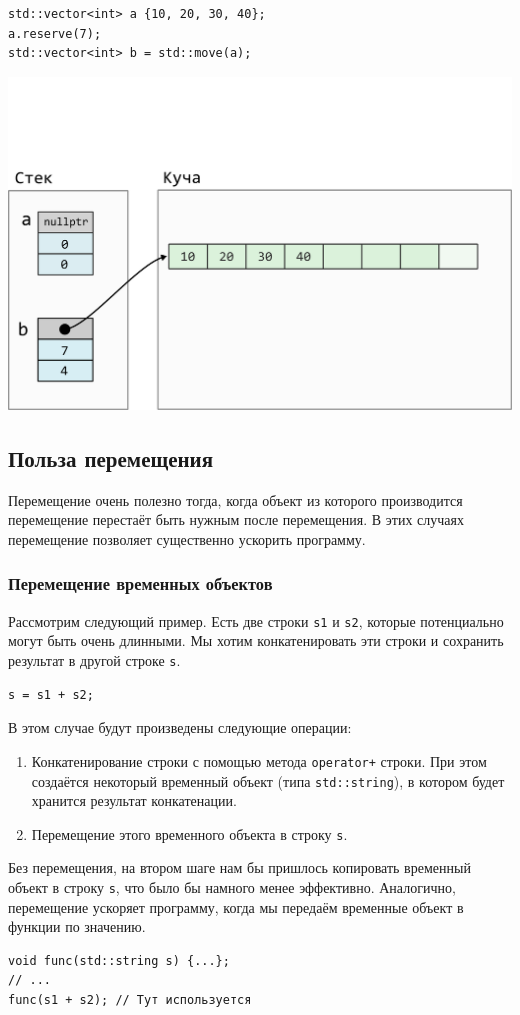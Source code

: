 \documentclass{article}
\begin{document}
\begin{lstlisting}
std::vector<int> a {10, 20, 30, 40};
a.reserve(7);
std::vector<int> b = std::move(a);
\end{lstlisting}
\begin{center}
\vspace*{-2.5cm}
\includegraphics[scale=0.7]{../images/vector_move.png}
\end{center}


\newpage

\subsection*{Польза перемещения}
Перемещение очень полезно тогда, когда объект из которого производится перемещение перестаёт быть нужным после перемещения. В этих случаях перемещение позволяет существенно ускорить программу.
\subsubsection*{Перемещение временных объектов}
Рассмотрим следующий пример. Есть две строки \texttt{s1} и \texttt{s2}, которые потенциально могут быть очень длинными. Мы хотим конкатенировать эти строки и сохранить результат в другой строке \texttt{s}.
\begin{lstlisting}
s = s1 + s2;
\end{lstlisting}
В этом случае будут произведены следующие операции:
\begin{enumerate}
\item Конкатенирование строки с помощью метода \texttt{operator+} строки. При этом создаётся некоторый временный объект (типа \texttt{std::string}), в котором будет хранится результат конкатенации.
\item Перемещение этого временного объекта в строку \texttt{s}.
\end{enumerate}
Без перемещения, на втором шаге нам бы пришлось копировать временный объект в строку \texttt{s}, что было бы намного менее эффективно.
Аналогично, перемещение ускоряет программу, когда мы передаём временные объект в функции по значению.
\begin{lstlisting}
void func(std::string s) {...};
// ...
func(s1 + s2); // Тут используется
\end{lstlisting}
\end{document}
